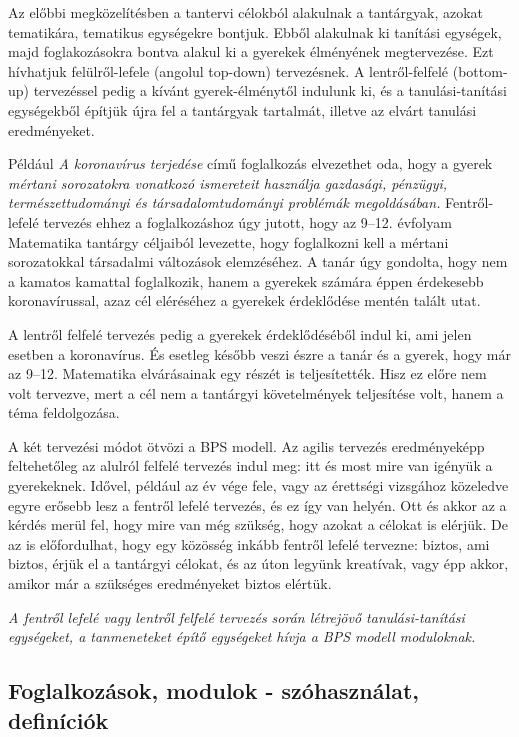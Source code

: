 Az előbbi megközelítésben a tantervi célokból alakulnak a tantárgyak,
azokat tematikára, tematikus egységekre bontjuk. Ebből alakulnak ki
tanítási egységek, majd foglakozásokra bontva alakul ki a gyerekek
élményének megtervezése. Ezt hívhatjuk felülről-lefele (angolul
top-down) tervezésnek. A lentről-felfelé (bottom-up) tervezéssel pedig
a kívánt gyerek-élménytől indulunk ki, és a tanulási-tanítási
egységekből építjük újra fel a tantárgyak tartalmát, illetve az elvárt
tanulási eredményeket.

Például \emph{A koronavírus terjedése} című foglalkozás elvezethet oda,
hogy a gyerek \emph{mértani sorozatokra vonatkozó ismereteit használja
gazdasági, pénzügyi, természettudományi és társadalomtudományi problémák
megoldásában.} Fentről-lefelé tervezés ehhez a foglalkozáshoz úgy
jutott, hogy az 9--12. évfolyam Matematika tantárgy céljaiból levezette,
hogy foglalkozni kell a mértani sorozatokkal társadalmi változások
elemzéséhez. A tanár úgy gondolta, hogy nem a kamatos kamattal
foglalkozik, hanem a gyerekek számára éppen érdekesebb koronavírussal,
azaz cél eléréséhez a gyerekek érdeklődése mentén talált utat.

A lentről felfelé tervezés pedig a gyerekek érdeklődéséből indul ki, ami
jelen esetben a koronavírus. És esetleg később veszi észre a tanár és a
gyerek, hogy már az 9--12. Matematika elvárásainak egy részét is
teljesítették. Hisz ez előre nem volt tervezve, mert a cél nem a
tantárgyi követelmények teljesítése volt, hanem a téma feldolgozása.

A két tervezési módot ötvözi a BPS modell. Az agilis tervezés
eredményeképp feltehetőleg az alulról felfelé tervezés indul meg: itt és
most mire van igényük a gyerekeknek. Idővel, például az év vége fele,
vagy az érettségi vizsgához közeledve egyre erősebb lesz a fentről
lefelé tervezés, és ez így van helyén. Ott és akkor az a kérdés merül
fel, hogy mire van még szükség, hogy azokat a célokat is elérjük. De az
is előfordulhat, hogy egy közösség inkább fentről lefelé tervezne:
biztos, ami biztos, érjük el a tantárgyi célokat, és az úton legyünk
kreatívak, vagy épp akkor, amikor már a szükséges eredményeket biztos
elértük.

\emph{A fentről lefelé vagy lentről felfelé tervezés során létrejövő
tanulási-ta\-ní\-tá\-si egységeket, a tanmeneteket építő egységeket hívja a
BPS modell moduloknak.}

\hypertarget{foglalkozasok-modulok---szohasznalat-definiciok}{%
\subsection{Foglalkozások, modulok - szóhasználat,
definíciók}\label{foglalkozasok-modulok---szohasznalat-definiciok}}


